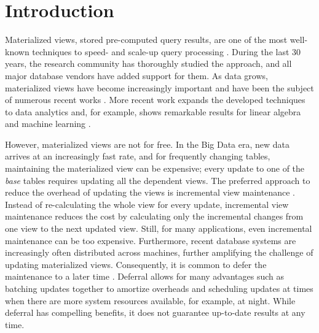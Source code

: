 \section{Introduction}
Materialized views, stored pre-computed query results, are one of the most well-known techniques to speed- and scale-up query processing \cite{LarsonY85, gupta1995maintenance, chirkova2011materialized, halevy2001answering}.
During the last 30 years, the research community has thoroughly studied the approach, and all major database vendors have added support for them. 
As data grows, materialized views have become increasingly important and have been the subject of numerous recent works \cite{lefevre2014opportunistic, bailis2014scalable, perez2014history}.
More recent work expands the developed techniques to data analytics and, for example, shows remarkable results for linear algebra and machine learning \cite{nikolic2014linview, zhang2014mat}.

However, materialized views are not for free. 
In the Big Data era, new data arrives at an increasingly fast rate, and for frequently changing tables, maintaining the materialized view can be expensive; every update to one of the {\em base} tables requires updating all the dependent views. 
The preferred approach to reduce the overhead of updating the views is incremental view maintenance \cite{gupta1995maintenance, chirkova2011materialized}.
Instead of re-calculating the whole view for every update, incremental view maintenance reduces the cost by calculating only the incremental changes from one view to the next updated view. 
Still, for many applications, even incremental maintenance can be too expensive. 
Furthermore, recent database systems are increasingly often distributed across machines, further amplifying the challenge of updating materialized views. 
Consequently, it is common to defer the maintenance to a later time \cite{chirkova2011materialized, zhou2007lazy}.
Deferral allows for many advantages such as batching updates together to amortize overheads and scheduling updates at times when there are more system resources available, for example, at night.
While deferral has compelling benefits, it does not guarantee up-to-date results at any time. 

